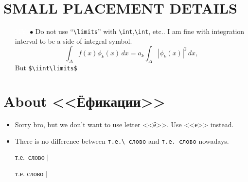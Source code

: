 \documentclass[a5paper,openany,9pt]{extbook}
\begin{document}
\section{SMALL PLACEMENT DETAILS}
\begin{itemize}
\item[\colorbox{prpl}{\textcolor{white}{MY}}\ $\bullet$]
Do not use ``\verb=\limits='' with \verb=\int=,\verb=\int=, etc.. I am fine with integration interval to be a side of integral-symbol.
$$
\int_\Delta{f(x) \phi_k(x)}\,dx=a_k\int_\Delta|\phi_k(x)|^2\,dx,
$$
But \verb=$\iint\limits$=
\end{itemize}

\section{About <<Ёфикации>>}
\begin{itemize}
\item
Sorry bro, but we don't want to use letter <<ё>>. Use <<е>> instead.
\item 
There is no difference between \verb=т.е.\ слово= and \verb=т.е. слово= nowadays. 

\begin{center}
т.е.\ слово $\Bigr|$
\end{center}
\begin{center}
т.е. слово $\Bigr|$
\end{center}
\end{itemize}




\newpage
\end{document}
